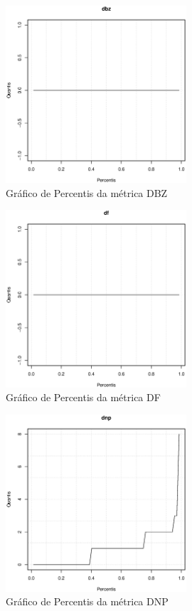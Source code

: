 \begin{anexosenv}
\newpage

\begin{figure}[h]
  \centering
  \includegraphics[width=0.6\textwidth]
      {dados/linux/dbz.eps}
  \caption{Gráfico de Percentis da métrica DBZ}
\end{figure}

\begin{figure}[h]
  \centering
  \includegraphics[width=0.6\textwidth]
      {dados/linux/df.eps}
  \caption{Gráfico de Percentis da métrica DF}
\end{figure}

\newpage

\begin{figure}[h]
  \centering
  \includegraphics[width=0.6\textwidth]
      {dados/linux/dnp.eps}
  \caption{Gráfico de Percentis da métrica DNP}
  \label{graphic:dnp}
\end{figure}


\end{anexosenv}
